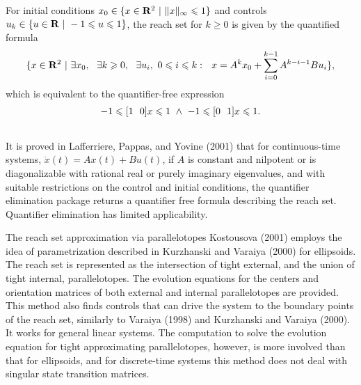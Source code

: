 \documentclass[letterpaper,10pt,english]{sphinxmanual}
\begin{document}
For initial conditions $x_0\in\{x\in {\bf R}^2 ~|~ \|x\|_{\infty} \leqslant1\}$ and
controls $u_k\in\{u\in {\bf R} ~|~ -1\leqslant u\leqslant1\}$, the
reach set for $k\geqslant0$ is given by the quantified formula
\begin{gather}
\begin{split}\{ x\in{\bf R}^2 ~|~ \exists x_0, ~~ \exists k\geqslant0, ~~
\exists u_i, ~ 0\leqslant i\leqslant k: ~~
x = A^kx_0+\sum_{i=0}^{k-1}A^{k-i-1}Bu_i \},\end{split}\notag
\end{gather}
which is equivalent to the quantifier-free expression
\begin{gather}
\begin{split}-1\leqslant[1 ~~ 0]x\leqslant1 ~ \wedge ~ -1\leqslant[0 ~~ 1]x\leqslant1.\end{split}\notag\\\begin{split}\end{split}\notag
\end{gather}
It is proved in Lafferriere, Pappas, and Yovine (2001) that for
continuous-time systems, $\dot{x}(t) = Ax(t) + Bu(t)$, if
$A$ is constant and nilpotent or is diagonalizable with rational
real or purely imaginary eigenvalues, and with suitable restrictions on
the control and initial conditions, the quantifier elimination package
returns a quantifier free formula describing the reach set. Quantifier
elimination has limited applicability.

The reach set approximation via parallelotopes Kostousova (2001) employs
the idea of parametrization described in Kurzhanski and Varaiya (2000)
for ellipsoids. The reach set is represented as the intersection of
tight external, and the union of tight internal, parallelotopes. The
evolution equations for the centers and orientation matrices of both
external and internal parallelotopes are provided. This method also
finds controls that can drive the system to the boundary points of the
reach set, similarly to Varaiya (1998) and Kurzhanski and Varaiya
(2000). It works for general linear systems. The computation to solve
the evolution equation for tight approximating parallelotopes, however,
is more involved than that for ellipsoids, and for discrete-time systems
this method does not deal with singular state transition matrices.
\end{document}
